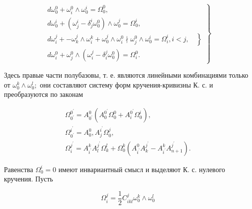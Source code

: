 \documentclass[10pt]{article}
\begin{document}
\[

\left.\begin{array}{l}

d \omega_{0}^{0}+\omega_{i}^{0} \wedge \omega_{0}^{i}=\Omega_{0}^{0}, \\

d \omega_{0}^{i}+\left(\omega_{j}^{i}-\delta_{j}^{i} \omega_{0}^{0}\right) \wedge \omega_{0}^{j}=\Omega_{0}^{i}, \\

\left.d \omega_{i}^{j}+-\omega_{k}^{j} \wedge \omega_{i}^{k}+\omega_{0}^{j} \wedge \omega_{i}^{0} \nmid \omega_{j}^{0} \wedge \omega_{0}^{i}=\Omega_{i}^{i}, i<j, \quad\right\} \\

d \omega_{i}^{0}+\omega_{j}^{0} \wedge\left(\omega_{i}^{j}-\delta_{i}^{j} \omega_{0}^{0}\right)=\Omega_{i}^{0} .

\end{array}\right\}

\]



Здесь правые части полубазовы, т. е. являются линейными комбинациями только от $\omega_{0}^{k} \wedge \omega_{0}^{l} ;$ они составляют систему форм кручения-кривизны К. с. и преобразуются по законам



\[

\begin{gathered}

\Omega_{0^{\prime}}^{0^{\prime}}=A_{0^{\prime}}^{0}\left(A_{0}^{0^{\prime}} \Omega_{0}^{0}+A_{i}^{0^{\prime}} \Omega_{0}^{i}\right), \\

\Omega_{0^{\prime}}^{i^{\prime}}=A_{0}^{0}, A_{j}^{i^{\prime}} \Omega_{0}^{j}, \\

\Omega_{i}^{j^{\prime}}=A_{i^{\prime}}^{k} A_{l}^{j^{\prime}} \Omega_{k}^{l}+\Omega_{0}^{k}\left(A_{i^{\prime}}^{0} A_{k}^{j^{\prime}}-A_{i^{\prime}}^{k} A_{n+1}^{j^{\prime}}\right) .

\end{gathered}

\]



Равенства $\Omega_{0}^{i}=0$ имеют инвариантный смысл и выделяют К. с. нулевого кручения. Пусть



\[

\Omega_{i}^{j}=\frac{1}{2} C_{i k l}^{j} \omega_{0}^{k} \wedge \omega_{0}^{l}

\]
\end{document}
